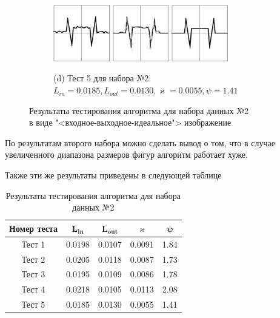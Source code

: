 \documentclass[12pt, a4paper]{article}
\renewcommand{\kappa}{\varkappa}
\begin{document}
\begin{figure}[!hp]
	\begin{subfigure}{\textwidth}
		\centering
		\includegraphics[width=0.27\textwidth]{res_n1_9}
		\hfill
		\includegraphics[width=0.27\textwidth]{res_n2_10}
		\hfill
		\includegraphics[width=0.27\textwidth]{5}
		\caption*{\small (d) Тест 5 для набора №2: $L_{in} = 0.0185, L_{out} = 0.0130, \kappa = 0.0055, \psi = 1.41$}
	\end{subfigure}
	\caption{Результаты тестирования алгоритма для набора данных №2\\ в виде "<входное-выходное-идеальное"> изображение}
\end{figure}
По результатам второго набора можно сделать вывод о том, что в случае увеличенного диапазона размеров фигур алгоритм работает хуже. 

Также эти же результаты приведены в следующей таблице
\begin{table}[!ht]
	\centering
	\caption{Результаты тестирования алгоритма для набора данных №2}
	\begin{tabular}{|c|c|c|c|c|}
		\hline
		\textbf{Номер теста} & \(\mathbf{L_{in}}\) & \(\mathbf{L_{out}}\) & \(\mathbf{\kappa}\) & \(\mathbf{\psi}\) \\ \hline
		Тест 1 & 0.0198 & 0.0107 & 0.0091 & 1.84 \\ \hline
		Тест 2 & 0.0205 & 0.0118 & 0.0087 & 1.73 \\ \hline
		Тест 3 & 0.0195 & 0.0109 & 0.0086 & 1.78 \\ \hline
		Тест 4 & 0.0218 & 0.0105 & 0.0113 & 2.08 \\ \hline
		Тест 5 & 0.0185 & 0.0130 & 0.0055 & 1.41 \\ \hline
	\end{tabular}
	\label{tab:results2}
\end{table}
\end{document}
